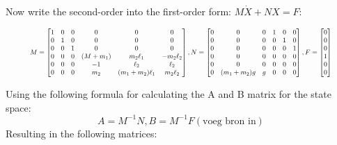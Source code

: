 \documentclass[10pt]{article}
\begin{document}
    Now write the second-order into the first-order form: $M \dot X + NX = F$:

    \begin{equation}
        \resizebox{.9\textwidth}{!}{$
        M=
        \begin{bmatrix}
            1&0&0&0&0&0\\
            0&1&0&0&0&0\\
            0&0&1&0&0&0\\
            0&0&0&(M+m_1) & m_2\ell_1         & -m_2\ell_2\\
            0&0&0&-1      & \ell_2            &  \ell_2\\
            0&0&0&m_2     & (m_1+m_2)\ell_1   & m_2\ell_2
        \end{bmatrix}
        ,N =
        \begin{bmatrix}
            0&0&0&1&0&0\\
            0&0&0&0&1&0\\
            0&0&0&0&0&1\\
            0&0&0&0&0&0\\
            0&0&0&0&0&0\\
            0&(m_1 +m_2)g& g &0&0&0
        \end{bmatrix}
        ,F=
        \begin{bmatrix}
            0\\
            0\\
            0\\
            1\\
            0\\
            0\\
        \end{bmatrix}$}
    \end{equation}

    Using the following formula for calculating the A and B matrix for the state space:
    \begin{equation}
        A = M^{-1}N, B = M^{-1}F (\text{voeg bron in}) 
    \end{equation}
    Resulting in the following matrices:
\end{document}
